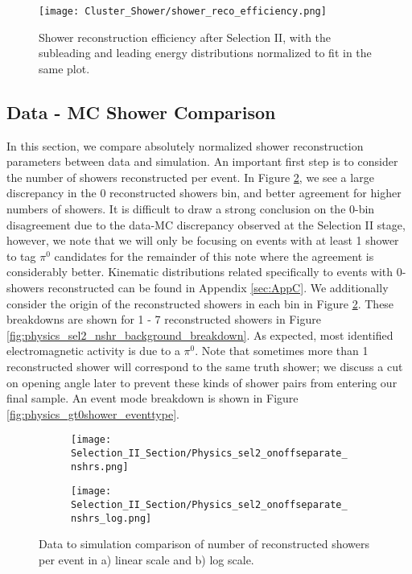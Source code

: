 \documentclass{article}
\begin{document}
\begin{figure}[h!]
\centering
\texttt{[image: Cluster\_Shower/shower\_reco\_efficiency.png]}
\caption{Shower reconstruction efficiency after Selection II, with the subleading and leading energy distributions normalized to fit in the same plot.  }
\label{fig:shower_reco_efficiency}
\end{figure}


\subsection{Data - MC Shower Comparison}

In this section, we compare absolutely normalized shower reconstruction parameters between data and simulation. An important first step is to consider the number of showers reconstructed per event.  In Figure \ref{fig:physics_sel2_nshrs}, we see a large discrepancy in the 0 reconstructed showers bin, and better agreement for higher numbers of showers. It is difficult to draw a strong conclusion on the 0-bin disagreement due to the data-MC discrepancy observed at the Selection II stage, however, we note that we will only be focusing on events with at least 1 shower to tag $\pi^0$ candidates for the remainder of this note where the agreement is considerably better. Kinematic distributions related specifically to events with 0-showers reconstructed can be found in Appendix \ref{sec:AppC}. We additionally consider the origin of the reconstructed showers in each bin in Figure \ref{fig:physics_sel2_nshrs}. These breakdowns are shown for 1 - 7 reconstructed showers in Figure \ref{fig:physics_sel2_nshr_background_breakdown}. As expected, most identified electromagnetic activity is due to a $\pi^0$. Note that sometimes more than 1 reconstructed shower will correspond to the same truth shower; we discuss a cut on opening angle later to prevent these kinds of shower pairs from entering our final sample.  An event mode breakdown is shown in Figure \ref{fig:physics_gt0shower_eventtype}.

% 
\begin{figure}[t!]
\centering
  \begin{subfigure}[t]{0.3\textwidth}
    \centering
\texttt{[image: Selection\_II\_Section/Physics\_sel2\_onoffseparate\_nshrs.png]}
  \caption{ }
  \end{subfigure} 
  \hspace{30 mm}
  \begin{subfigure}[t]{0.3\textwidth}
    \centering
\texttt{[image: Selection\_II\_Section/Physics\_sel2\_onoffseparate\_nshrs\_log.png]}
  \caption{ }
  \end{subfigure} 

\caption{ Data to simulation comparison of number of reconstructed showers per event in a) linear scale and b) log scale. }
\label{fig:physics_sel2_nshrs}
\end{figure}
\end{document}
